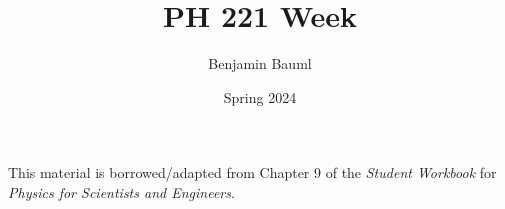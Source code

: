 \documentclass[]{article}
\title{PH 221 Week \Week}
\author{Benjamin Bauml}
\date{Spring 2024}
\newcommand{\FileDepth}{../../..}
\begin{document}
\maketitle
\begin{center}
	This material is borrowed/adapted from Chapter 9 of the \textit{Student Workbook} for \textit{Physics for Scientists and Engineers}.
\end{center}




\end{document}
